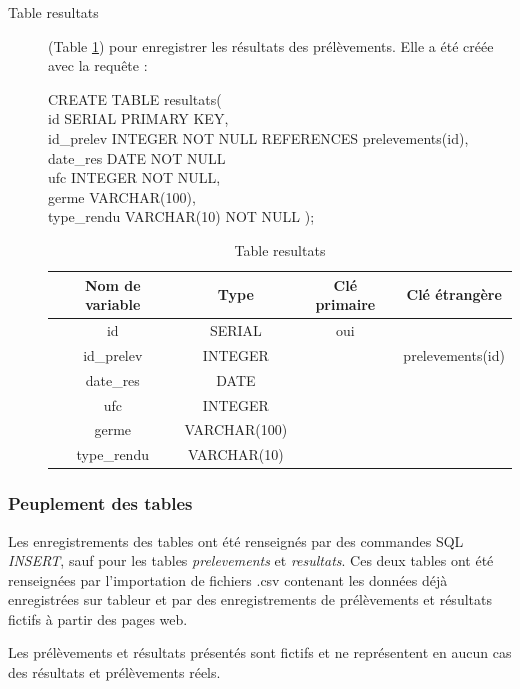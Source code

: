 \documentclass[12pt,a4paper,oneside]{article}
\begin{document}
\begin{description}
\item[Table resultats] (Table \ref{resultats}) pour enregistrer les résultats des prélèvements. Elle a été créée avec la requête :

\begin{tabbing}
CREATE TABLE resultats(\\
id SERIAL PRIMARY KEY,\\
id\_prelev INTEGER NOT NULL REFERENCES prelevements(id),\\
date\_res DATE NOT NULL\\
\nopagebreak
ufc INTEGER NOT NULL,\\
germe VARCHAR(100),\\
type\_rendu VARCHAR(10) NOT NULL
);
\end{tabbing}
\begin{table}
\caption{Table resultats \label{resultats}}
\begin{center}
\begin{tabular}{|c|c|c|c|}
	\hline
	\textbf{Nom de variable} & \textbf{Type} & \textbf{Clé primaire} & \textbf{Clé étrangère}\\
	\hline
	id & SERIAL & oui & \\
	id\_prelev & INTEGER & & prelevements(id) \\
	date\_res & DATE & & \\
	ufc & INTEGER & & \\
	germe & VARCHAR(100) & & \\
	type\_rendu & VARCHAR(10) & & \\
	\hline
\end{tabular}
\end{center}
\end{table}

\end{description}

\subsubsection{Peuplement des tables}
Les enregistrements des tables ont été renseignés par des commandes SQL \emph{INSERT}, sauf pour les tables \emph{prelevements} et \emph{resultats}. Ces deux tables ont été renseignées par l'importation de fichiers .csv contenant les données déjà enregistrées sur tableur et par des enregistrements de prélèvements et résultats fictifs à partir des pages web.

Les prélèvements et résultats présentés sont fictifs et ne représentent en aucun cas des résultats et prélèvements réels.
\end{document}
